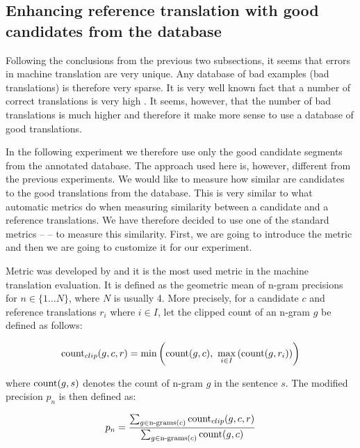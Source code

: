 \subsection{Enhancing reference translation with good candidates from the database}

Following the conclusions from the previous two subsections, it seems that
errors in machine translation are very unique. Any database of bad examples
(bad translations) is therefore very sparse. It is very well known fact that a
number of correct translations is very high . It
seems, however, that the number of bad translations is much higher and
therefore it make more sense to use a database of good translations. 

In the following experiment we therefore use only the good candidate segments
from the annotated database. The approach used here is, however, different from
the previous experiments. We would like to measure how similar are candidates
to the good translations from the database. This is very similar to what
automatic metrics do when measuring similarity between a candidate and a
reference translations. We have therefore decided to use one of the standard
metrics --  -- to measure this similarity. First, we are going to
introduce the metric and then we are going to customize it for our experiment. 

Metric  was developed by  and it is the
most used metric in the machine translation evaluation. It is defined as the
geometric mean of n-gram precisions for $n \in \{1 \ldots N\}$, where $N$ is
usually 4. More precisely, for a candidate $c$ and reference translations $r_i$
where $i \in I$, let the clipped count of an n-gram $g$ be defined as follows:

\begin{equation*}
    \text{count}_{clip}(g,c,r) = \min \left( \operatorname{count}(g, c), ~ \max_{i \in I} \left( \operatorname{count}(g, r_i) \right) \right)
\end{equation*}

\noindent where $\operatorname{count}(g, s)$ denotes the count of n-gram $g$ in the sentence
$s$. The modified precision $p_n$ is then defined as:

\begin{equation*}
    p_n = \frac{
        \sum_{g \in \text{n-grams}(c)} \text{count}_{clip}(g,c,r)
    }{
        \sum_{g \in \text{n-grams}(c)} \operatorname{count}(g,c)
    }
\end{equation*}

